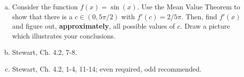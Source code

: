 \documentclass[12pt]{article}
\begin{document}
\begin{enumerate}[(a)]
\item
Consider the function $f(x) = \sin(x)$. Use the Mean Value Theorem to show
that there is a $c \in (0, 5\pi/2)$ with $f'(c) = 2/5\pi$. Then, find $f'(x)$ and figure
out, {\bf approximately}, all possible values of $c$. Draw a picture which illustrates your conclusions.

\item
Stewart, Ch. 4.2, 7-8.

\item
Stewart, Ch. 4.2, 1-4, 11-14; even required, odd recommended.

\end{enumerate}
\end{document}
